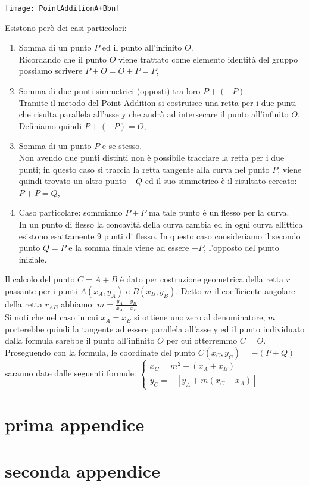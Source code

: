 \documentclass[a4paper,12pt]{tesiinfo}
\begin{document}
\begin{center}
\texttt{[image: PointAdditionA+Bbn]}
\end{center}
Esistono per\`o dei casi particolari:
\begin{enumerate}
    \item Somma di un punto $P$ ed il punto all'infinito $O$. 
    \\
    Ricordando che il punto $O$ viene trattato come elemento identit\`a del gruppo possiamo scrivere $P+O = O+P = P$,
    \item Somma di due punti simmetrici (opposti) tra loro $P + (-P)$. 
    \\
    Tramite il metodo del Point Addition si costruisce una retta per i due punti che risulta parallela all'asse y che andr\`a ad intersecare il punto all'infinito $O$. Definiamo quindi $P + (-P) = O$,
    \item Somma di un punto $P$ e se stesso. 
    \\
    Non avendo due punti distinti non \`e possibile tracciare la retta per i due punti; in questo caso si traccia la retta tangente alla curva nel punto $P$, viene quindi trovato un altro punto $-Q$ ed il suo simmetrico \`e il risultato cercato: $P + P = Q$,
    \item Caso particolare: sommiamo $P+P$ ma tale punto \`e un flesso per la curva. 
    \\
    In un punto di flesso la concavit\`a della curva cambia ed in ogni curva ellittica esistono esattamente 9 punti di flesso. In questo caso consideriamo il secondo punto $Q =P$ e la somma finale viene ad essere $-P$, l'opposto del punto iniziale.
\end{enumerate}
Il calcolo del punto $C = A + B$ \`e dato per costruzione geometrica della retta $r$ passante per i punti $A(x_A, y_A)$ e $B(x_B, y_B)$. Detto $m$ il coefficiente angolare della retta $r_{AB}$ abbiamo: $m = \frac{y_A - y_B}{x_A - x_B}$
\\
Si noti che nel caso in cui $x_A = x_B$ si ottiene uno zero al denominatore, $m$ porterebbe quindi la tangente ad essere parallela all'asse y ed il punto individuato dalla formula sarebbe il punto all'infinito $O$ per cui otterremmo $C = O$.
\\
Proseguendo con la formula, le coordinate del punto $C(x_C, y_C) = -(P+Q)$ saranno date dalle seguenti formule:
$\begin{cases}
x_C = m^2 - (x_A + x_B)\\
y_C = -[y_A + m(x_C - x_A)]
\end{cases}$
%
%
%
%
%
%
%
%
%
%
%
%
%
%
%
%
%
%
%
%
\appendice
\chapter{prima appendice}
%
%
%
%
%
%
%
%
%
%
\chapter{seconda appendice}
%
%
%
%
%
%
%
%
%
%
\end{document}
